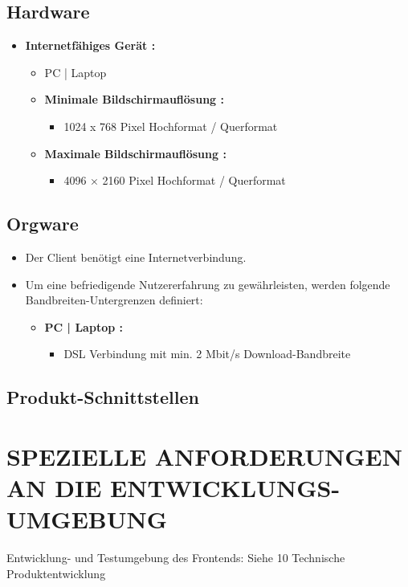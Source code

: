 	\subsection{Hardware}
	\begin{itemize}
		\item \textbf{Internetfähiges Gerät :}
		\begin{itemize}
			\item PC | Laptop
			\item \textbf{Minimale Bildschirmauflösung :}
				\begin{itemize}
					\item 1024 x 768 Pixel Hochformat / Querformat
				\end{itemize}
					\item \textbf{Maximale Bildschirmauflösung :}
				\begin{itemize}
				\item 4096 × 2160 Pixel Hochformat / Querformat
				\end{itemize}		
		\end{itemize}
	\end{itemize}
	\subsection{Orgware}
	\begin{itemize}
		\item Der Client benötigt eine Internetverbindung.
		\item Um eine befriedigende Nutzererfahrung zu gewährleisten, werden folgende Bandbreiten-Untergrenzen definiert:
		\begin{itemize}
			\item \textbf{ PC | Laptop :}
			\begin{itemize}
				\item DSL Verbindung mit min. 2 Mbit/s Download-Bandbreite
			\end{itemize}
		\end{itemize}
	\end{itemize}
	\subsection{Produkt-Schnittstellen}
	
	
	\section{\Large SPEZIELLE ANFORDERUNGEN AN DIE ENTWICKLUNGS-UMGEBUNG}
	Entwicklung- und Testumgebung des Frontends: Siehe 10 Technische Produktentwicklung 
